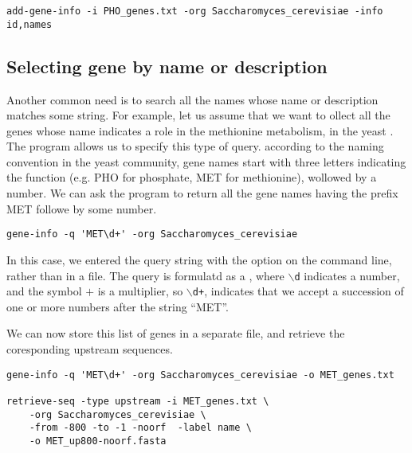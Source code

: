 {\color{Blue} \begin{footnotesize}
\begin{verbatim}
add-gene-info -i PHO_genes.txt -org Saccharomyces_cerevisiae -info id,names
\end{verbatim} \end{footnotesize}
}

\subsection{Selecting gene by name or description}

Another common need is to search all the names whose name or
description matches some string. For example, let us assume that we
want to ollect all the genes whose name indicates a role in the
methionine metabolism, in the yeast .
The program  allows us to specify this type of
query. according to the naming convention in the yeast community, gene
names start with three letters indicating the function (e.g. PHO for
phosphate, MET for methionine), wollowed by a number. We can ask the
program to return all the gene names having the prefix MET followe by
some number.

{\color{Blue} \begin{footnotesize}
\begin{verbatim}
gene-info -q 'MET\d+' -org Saccharomyces_cerevisiae
\end{verbatim} \end{footnotesize}
}

In this case, we entered the query string with the option 
on the command line, rather than in a file. The query is formulatd as
a , where \texttt{$\backslash$d} indicates
a number, and the symbol $+$ is a multiplier, so
 \texttt{$\backslash$d+}, indicates that we accept a succession of one
or more numbers after the string ``MET''.

We can now store this list of genes in a separate file, and retrieve
the coresponding upstream sequences.


{\color{Blue} \begin{footnotesize}
\begin{verbatim}
gene-info -q 'MET\d+' -org Saccharomyces_cerevisiae -o MET_genes.txt

retrieve-seq -type upstream -i MET_genes.txt \
    -org Saccharomyces_cerevisiae \
    -from -800 -to -1 -noorf  -label name \
    -o MET_up800-noorf.fasta
\end{verbatim} \end{footnotesize}
}


